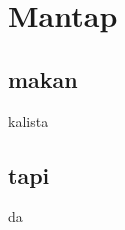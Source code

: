 \documentclass[11pt]{article}
\date{\today}
\title{}
\begin{document}
\tableofcontents

\section{Mantap}
\label{sec:orgc1f8ab1}

\subsection{makan}
\label{sec:org001cb7a}
kalista
\subsection{tapi}
\label{sec:org2db4b84}

da
\end{document}
